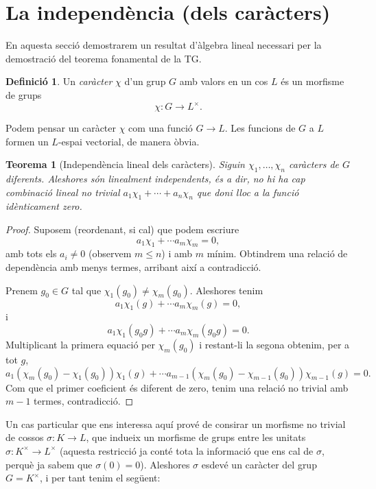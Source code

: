 \documentclass[
]{book}
\newtheorem{theorem}{Teorema}[chapter]
\theoremstyle{definition}
\newtheorem{definition}{Definició}[chapter]
\theoremstyle{definition}
\theoremstyle{definition}
\theoremstyle{definition}
\theoremstyle{remark}
\begin{document}
\hypertarget{la-independuxe8ncia-dels-caruxe0cters}{%
\section{La independència (dels caràcters)}\label{la-independuxe8ncia-dels-caruxe0cters}}

En aquesta secció demostrarem un resultat d'àlgebra lineal necessari per la demostració del teorema fonamental de la TG.

\begin{definition}
\protect\hypertarget{def:caracter}{}\label{def:caracter}Un \emph{caràcter} \(\chi\) d'un grup \(G\) amb valors en un cos \(L\) és un morfisme de grups
\[
\chi \colon G \to L^\times.
\]
\end{definition}

Podem pensar un caràcter \(\chi\) com una funció \(G\to L\). Les funcions de \(G\) a \(L\) formen un \(L\)-espai vectorial, de manera òbvia.

\begin{theorem}[Independència lineal dels caràcters]
\protect\hypertarget{thm:caracters-li}{}\label{thm:caracters-li}Siguin \(\chi_1,\ldots,\chi_n\) caràcters de \(G\) diferents. Aleshores són linealment independents, és a dir, no hi ha
cap combinació lineal no trivial \(a_1\chi_1+\cdots+a_n\chi_n\) que doni lloc a la funció idènticament zero.
\end{theorem}

\begin{proof}
Suposem (reordenant, si cal) que podem escriure
\[
a_1\chi_1 + \cdots a_m\chi_m = 0,
\]
amb tots els \(a_i\neq 0\) (observem \(m\leq n\)) i amb \(m\) mínim. Obtindrem una relació de dependència amb menys termes, arribant així a contradicció.

Prenem \(g_0\in G\) tal que \(\chi_1(g_0)\neq \chi_m(g_0)\). Aleshores tenim
\[
a_1\chi_1(g) + \cdots a_m\chi_m(g) = 0,
\]
i
\[
a_1\chi_1(g_0g) + \cdots a_m\chi_m(g_0g) = 0.
\]
Multiplicant la primera equació per \(\chi_m(g_0)\) i restant-li la segona obtenim, per a tot \(g\),
\[
a_1(\chi_m(g_0)-\chi_1(g_0)) \chi_1(g) + \cdots a_{m-1}(\chi_m(g_0)- \chi_{m-1}(g_0)) \chi_{m-1}(g) = 0.
\]
Com que el primer coeficient és diferent de zero, tenim una relació no trivial amb \(m-1\) termes, contradicció.
\end{proof}

Un cas particular que ens interessa aquí prové de consirar un morfisme no trivial de cossos \(\sigma\colon K\to L\),
que indueix un morfisme de grups entre les unitats \(\sigma\colon K^\times \to L^\times\) (aquesta restricció ja conté
tota la informació que ens cal de \(\sigma\), perquè ja sabem que \(\sigma(0)=0\)). Aleshores \(\sigma\) esdevé un caràcter
del grup \(G=K^\times\), i per tant tenim el següent:
\end{document}
